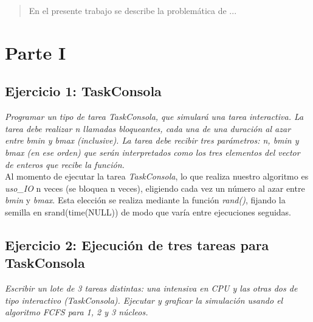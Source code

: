 \documentclass[a4paper]{article}
\begin{document}
\thispagestyle{empty}

\maketitle
\newpage

\thispagestyle{empty}
\vfill
\begin{abstract}
En el presente trabajo se describe la problemática de ...
\end{abstract}


\thispagestyle{empty}
\vspace{3cm}
\tableofcontents
\newpage


\newpage
\section{Parte I}

\subsection{Ejercicio 1: TaskConsola}
\textit{Programar un tipo de tarea TaskConsola, que simular\'a una tarea interactiva. La tarea debe realizar n llamadas bloqueantes, cada una de una duraci\'on al azar entre bmin y bmax (inclusive). La tarea debe recibir tres par\'ametros: n, bmin y bmax (en ese orden) que ser\'an interpretados como los tres elementos del vector de enteros que recibe la funci\'on.}\\

Al momento de ejecutar la tarea \emph{TaskConsola}, lo que realiza nuestro algoritmo es \emph{uso_IO} n veces (se bloquea n veces), eligiendo cada vez un n\'umero al azar entre \textit{bmin} y \textit{bmax}. Esta elecci\'on se realiza mediante la funci\'on \textit{rand()}, fijando la semilla en srand(time(NULL)) de modo que var\'ia entre ejecuciones seguidas.



\subsection{Ejercicio 2: Ejecuci\'on de tres tareas para TaskConsola}\label{ej2}
\textit{Escribir un lote de 3 tareas distintas: una intensiva en CPU y las otras dos de tipo interactivo (TaskConsola). Ejecutar y graficar la simulaci\'on usando el algoritmo FCFS para 1, 2 y 3 n\'ucleos.}\\
\end{document}
